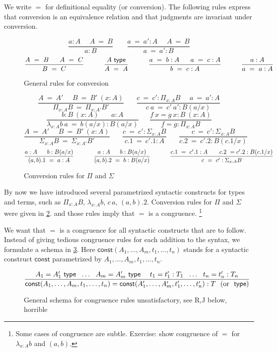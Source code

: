 \documentclass[11pt,a4paper]{article}
\theoremstyle{definition}
\newcommand{\conv}{=}
\newcommand{\type}{\mathsf{type}}
\newcommand{\const}{\mathsf{const}}
\newcommand{\mypi}[3]{\Pi_{#1:#2}#3}
\newcommand{\mylam}[3]{\lambda_{#1:#2}#3}
\newcommand{\app}[2]{{#1\,#2}} %
\newcommand{\mysig}[3]{\Sigma_{#1:#2}#3}
\begin{document}
We write $\conv$ for definitional equality (or conversion).
The following rules express that conversion is an equivalence
relation and that judgments are invariant under conversion.

\begin{figure}[h]
  \caption{General rules for conversion}\label{fig:conversion}
$$
\frac{ a:A~~~~~~ A~ \conv~ B}{ a:B}~~~~~~~~~
\frac{ a ~\conv~a':A~~~~~~ A  ~\conv~ B}{ a ~\conv~a':B}
$$
$$
\frac{A~=~B~~~~~A~=~C}{B~=~C}~~~~~~~~~\frac{A~\type}{A~=~A}~~~~~~~~~
\frac{a~=~b:A~~~~~a~=~c:A}{b~=~c:A}~~~~~~~~~\frac{a:A}{a~=~a:A}
\belowdisplayshortskip 1pt
$$
\end{figure}

\begin{figure}[H]
  \caption{Conversion rules for $\Pi$ and $\Sigma$}\label{fig:convPiSig}
$$
\frac{A~=~A'~~~~~~B~=~B'~(x:A)}{\mypi{x}{A}{B}~=~\mypi{x}{A'}{B'}}~~~~~~~~
\frac{c~=~c':\mypi{x}{A}{B}~~~~~~a~=~a':A}{c~a~=~c'~a':B(a/x)}
$$
$$
\frac{b:B~(x:A)~~~~~~~~ a:A}{ \mylam{x}{A}{b}~a  ~\conv~ b(a/x):B(a/x)}
~~~~~~~
\frac{f~x = g~x:B~(x:A)}{ f = g : \mypi{x}{A}{B}}
$$
$$
\frac{A~=~A'~~~~~~B~=~B'~(x:A)}{\mysig{x}{A}{B}~=~\mysig{x}{A'}{B'}}~~~~~~~~
\frac{c~=~c':\mysig{x}{A}{B}}{c.1~=~c'.1:A}~~~~~~~~
\frac{c~=~c':\mysig{x}{A}{B}}{c.2~=~c'.2:B(c.1/x)}~~~~~~~~
$$
$$
\frac{a:A~~~~~b:B(a/x)}{ (a,b).1 ~\conv~ a:A}~~~~~~~~~~
\frac{a:A~~~~~b:B(a/x)}{ (a,b).2 ~\conv~ b:B(a/x)}~~~~~~~~~~
\frac{c.1~=~ c'.1:A~~~~~~c.2~=c'.2:B(c.1/x)}{ c~=~ c' : \mysig{x}{A}{B}}
\belowdisplayshortskip 0pt
$$
\end{figure}

By now we have introduced several parametrized syntactic constructs
for types and terms, such as $\mypi{x}{A}{B}$,
$\mylam{x}{A}{b}$, $\app{c}{a}$, $(a,b).2$.
Conversion rules for $\Pi$ and $\Sigma$ were given in \cref{fig:convPiSig}.
and those rules imply that $=$ is a congruence.%
\footnote{Some cases of congruence are subtle. Exercise:
show congruence of $=$ for $\mylam{x}{A}{b}$ and $(a,b)$.}

We want that $=$ is a congruence for all syntactic constructs
that are to follow.
Instead of giving tedious congruence rules for
each addition to the syntax, we formulate a schema in \cref{fig:congr}.
Here $\const(A_1,\ldots,A_m,t_1,\ldots,t_n)$ stands for a syntactic
construct $\const$ parametrized by $A_1,\ldots,A_m,t_1,\ldots,t_n$.

\begin{figure}[h!]
  \caption{General schema for congruence rules
  {\color{red}unsatisfactory, see R,J below, horrible}}\label{fig:congr}
$$
\frac{A_1 = A'_1~\type~~\ldots~~ A_m = A'_m~\type  ~~~~
t_1 = t'_1 : T_1 ~~\ldots~~  t_n = t'_n : T_n}
{\const(A_1,\ldots,A_m,t_1,\ldots,t_n) =
\const(A'_1,\ldots,A'_m,t'_1,\ldots,t'_n) : T \text{~~(or $~\type$)}}
\belowdisplayshortskip -1pt
$$
\end{figure}
\end{document}
